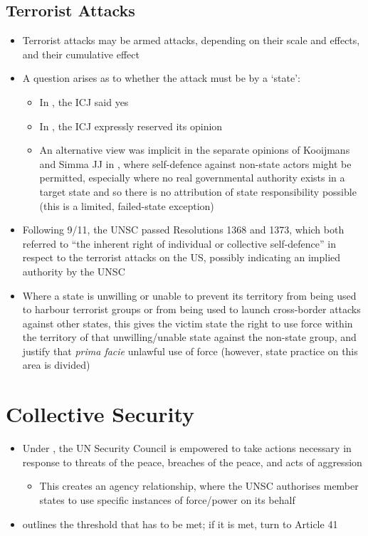 \subsection{Terrorist Attacks}
\begin{itemize}
    \item Terrorist attacks may be armed attacks, depending on their scale and effects, and their cumulative effect
    \item A question arises as to whether the attack must be by a `state':
    \begin{itemize}
        \item In , the ICJ said yes
        \item In , the ICJ expressly reserved its opinion
        \item An alternative view was implicit in the separate opinions of Kooijmans and Simma JJ in , where self-defence against non-state actors might be permitted, especially where no real governmental authority exists in a target state and so there is no attribution of state responsibility possible (this is a limited, failed-state exception)
    \end{itemize}
    \item Following 9/11, the UNSC passed Resolutions 1368 and 1373, which both referred to ``the inherent right of individual or collective self-defence'' in respect to the terrorist attacks on the US, possibly indicating an implied authority by the UNSC
    \item Where a state is unwilling or unable to prevent its territory from being used to harbour terrorist groups or from being used to launch cross-border attacks against other states, this gives the victim state the right to use force within the territory of that unwilling/unable state against the non-state group, and justify that \textit{prima facie} unlawful use of force (however, state practice on this area is divided)
\end{itemize}

\section{Collective Security}
\begin{itemize}
    \item Under , the UN Security Council is empowered to take actions necessary in response to threats of the peace, breaches of the peace, and acts of aggression
    \begin{itemize}
        \item This creates an agency relationship, where the UNSC authorises member states to use specific instances of force/power on its behalf
    \end{itemize}
    \item {} outlines the threshold that has to be met; if it is met, turn to Article 41
\end{itemize}

